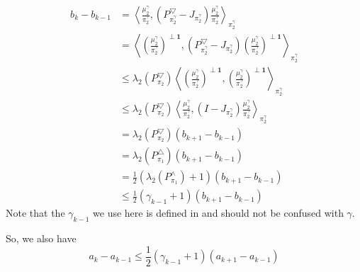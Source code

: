 \documentclass{article}
\def\<{\left\langle}
\def\>{\right\rangle}
\begin{document}
\begin{align*}
  b_{k} - b_{k-1}
  &= \<\frac{\mu_2^\gamma}{\pi_2^\gamma}, (P_{\pi_2^\gamma}^{\bigtriangledown} - J_{\pi_2^\gamma})\frac{\mu_2^\gamma}{\pi_2^\gamma}\>_{\pi_2^\gamma} \\
  &= \<(\frac{\mu_2^\gamma}{\pi_2^\gamma})^{\perp \mathbf{1}}, (P_{\pi_2^\gamma}^{\bigtriangledown} - J_{\pi_2^\gamma})(\frac{\mu_2^\gamma}{\pi_2^\gamma})^{\perp \mathbf{1}}\>_{\pi_2^\gamma} \\
  &\leq \lambda_2(P_{\pi_2}^\bigtriangledown)\<(\frac{\mu_2^\gamma}{\pi_2^\gamma})^{\perp \mathbf{1}}, (\frac{\mu_2^\gamma}{\pi_2^\gamma})^{\perp \mathbf{1}}\>_{\pi_2^\gamma} \\
  &\leq \lambda_2(P_{\pi_2}^\bigtriangledown)\<\frac{\mu_2^\gamma}{\pi_2^\gamma}, (I - J_{\pi_2^\gamma}) \frac{\mu_2^\gamma}{\pi_2^\gamma}\>_{\pi_2^\gamma} \\
  &= \lambda_2(P_{\pi_2}^\bigtriangledown) (b_{k+1} - b_{k-1}) \\
  &= \lambda_2(P_{\pi_1}^\bigtriangleup) (b_{k+1} - b_{k-1}) \\
  &= \frac{1}{2}(\lambda_2(P_{\pi_1}^\land) + 1) (b_{k+1} - b_{k-1}) \\
  &\leq \frac{1}{2}(\gamma_{k-1} + 1) (b_{k+1} - b_{k-1})
\end{align*}
Note that the $\gamma_{k-1}$ we use here is defined in \cite{alev2020improved} and should not be confused with $\gamma$.

So, we also have
\[a_k - a_{k-1} \leq \frac{1}{2}(\gamma_{k-1} + 1) (a_{k+1} - a_{k-1})\]

\clearpage


\end{document}
